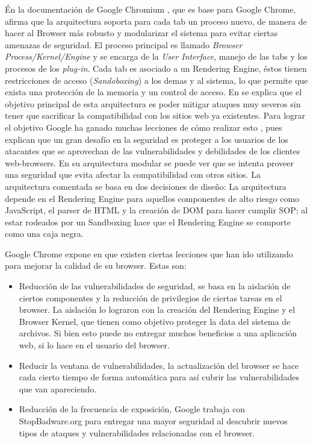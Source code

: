     Én la documentación de Google Chromium \cite{multiProcArchG}, que es base para Google Chrome, afirma que la arquitectura soporta para cada tab un proceso nuevo, de manera de hacer al Browser más robusto y modularizar el sistema para evitar ciertas amenazas de seguridad. El proceso principal es llamado \textit{Browser Process/Kernel/Engine} y se encarga de la \textit{User Interface}, manejo de las tabs y los procesos de los \textit{plug-in}. Cada tab es asociado a un Rendering Engine, éstos tienen restricciones de acceso (\textit{Sandoboxing}) a los demas y al sistema, lo que permite que exista una protección de la memoria y un control de acceso. En \cite{barth2008security} se explica que el objetivo principal de esta arquitectura es poder mitigar ataques muy severos sin tener que sacrificar la compatibilidad con los sitios web ya existentes. Para lograr el objetivo Google ha ganado muchas lecciones de cómo realizar esto \cite{reis2009browser}, pues explican que un gran desafío en la seguridad es proteger a los usuarios de los atacantes que se aprovechan de las vulnerabilidades y debilidades de los clientes web-browsers. En su arquitectura modular se puede ver que se intenta proveer una seguridad que evita afectar la compatibilidad con otros sitios. La arquitectura comentada se basa en dos decisiones de diseño: La arquitectura depende en el Rendering Engine para aquellos componentes de alto riesgo como JavaScript, el parser de HTML y la creación de DOM para hacer cumplir SOP; al estar rodeados por un Sandboxing hace que el Rendering Engine se comporte como una caja negra. 


    Google Chrome expone en \cite{reis2009browser} que existen ciertas lecciones que han ido utilizando para mejorar la calidad de su browser. Estas son:

    \begin{itemize}
    	\item Reducción de las vulnerabilidades de seguridad, se basa en la aislación de ciertos componentes y la reducción de privilegios de ciertas tareas en el browser. La aislación lo lograron con la creación del Rendering Engine y el Browser Kernel, que tienen como objetivo proteger la data del sistema de archivos. Si bien esto puede no entregar muchos beneficios a una aplicación web, si lo hace en el usuario del browser.
    	\item Reducir la ventana de vulnerabilidades, la actualización del browser se hace cada cierto tiempo de forma automática para así cubrir las vulnerabilidades que van apareciendo.
    	\item Reducción de la frecuencia de exposición, Google trabaja con StopBadware.org para entregar una mayor seguridad al descubrir nuevos tipos de ataques y vulnerabilidades relacionadas con el browser.
    \end{itemize}



